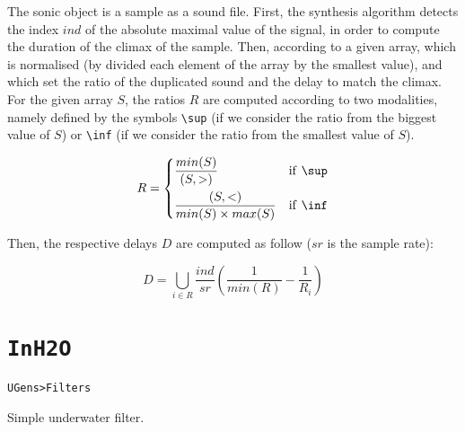 \bigskip
The sonic object is a sample as a sound file. First, the synthesis algorithm detects the index $ind$ of the absolute maximal value of the signal, in order to compute the duration of the climax of the sample. Then, according to a given array, which is normalised (by divided each element of the array by the smallest value), and which set the ratio of the duplicated sound and the delay to match the climax. For the given array $S$, the ratios $R$ are computed according to two modalities, namely defined by the symbols \texttt{\textbackslash sup} (if we consider the ratio from the biggest value of $S$) or \texttt{\textbackslash inf} (if we consider the ratio from the smallest value of $S$).

\[
     R =
\begin{dcases}
	\frac{min(S)}{(S, >)}  & \text{if \texttt{\textbackslash sup}}\\
	\frac{(S, <)}{min(S) \times max(S)}  & \text{if \texttt{\textbackslash inf}} 
   \end{dcases}
\]

\bigskip
Then, the respective delays $D$ are computed as follow ($sr$ is the sample rate):
 
\[
D = \bigcup_{i \in R} \frac{ind}{sr}  \left( \frac{1}{min(R)} - \frac{1}{R_i} \right)
\]


\section{\texttt{InH2O}}
\label{inh2o}

\texttt{UGens>Filters}

\bigskip

Simple underwater filter.


